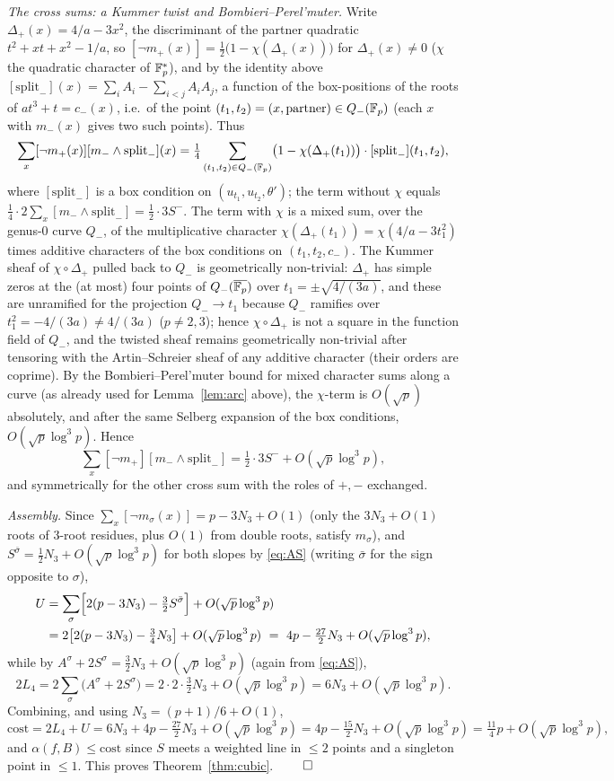 \smallskip\noindent\emph{The cross sums: a Kummer twist and Bombieri--Perel'muter.} Write
$\Delta_+(x)=4/a-3x^2$, the discriminant of the partner quadratic $t^2+xt+x^2-1/a$, so $[\neg m_+(x)]=
\tfrac12\bigl(1-\chi(\Delta_+(x))\bigr)$ for $\Delta_+(x)\ne0$ ($\chi$ the quadratic character of $\mathbb{F}_p^*$), and by
the identity above $[\mathrm{split}_-](x)=\sum_iA_i-\sum_{i<j}A_iA_j$, a function of the box-positions of the roots
of $at^3+t=c_-(x)$, i.e.\ of the point $(t_1,t_2)=(x,\text{partner})\in Q_-(\mathbb{F}_p)$ (each $x$ with $m_-(x)$ gives two such
points). Thus
\[
\sum_x[\neg m_+(x)][m_-\wedge\mathrm{split}_-](x)=\tfrac14\sum_{(t_1,t_2)\in Q_-(\mathbb{F}_p)}\bigl(1-\chi(\Delta_+(t_1))\bigr)\cdot[\mathrm{split}_-](t_1,t_2),
\]
where $[\mathrm{split}_-]$ is a box condition on $(u_{t_1},u_{t_2},\theta')$; the term without $\chi$ equals
$\tfrac14\cdot2\sum_x[m_-\wedge\mathrm{split}_-]=\tfrac12\cdot3S^-$. The term with $\chi$ is a mixed sum, over the genus-$0$ curve $Q_-$, of the
multiplicative character $\chi(\Delta_+(t_1))=\chi(4/a-3t_1^2)$ times additive characters of the box conditions on
$(t_1,t_2,c_-)$. The Kummer sheaf of $\chi\circ\Delta_+$ pulled back to $Q_-$ is geometrically non-trivial: $\Delta_+$
has simple zeros at the (at most) four points of $Q_-(\overline{\mathbb{F}_p})$ over $t_1=\pm\sqrt{4/(3a)}$, and these are
unramified for the projection $Q_-\to t_1$ because $Q_-$ ramifies over $t_1^2=-4/(3a)\ne4/(3a)$ ($p\ne2,3$); hence
$\chi\circ\Delta_+$ is not a square in the function field of $Q_-$, and the twisted sheaf remains geometrically
non-trivial after tensoring with the Artin--Schreier sheaf of any additive character (their orders are coprime).
By the Bombieri--Perel'muter bound for mixed character sums along a curve \cite{Perelmuter} (as already used for
Lemma~\ref{lem:arc} above), the $\chi$-term is $O(\sqrt p)$ absolutely, and after the same Selberg expansion of the
box conditions, $O(\sqrt p\log^3p)$. Hence
\[
\sum_x[\neg m_+][m_-\wedge\mathrm{split}_-]=\tfrac12\cdot3S^-+O(\sqrt p\log^3p),
\]
and symmetrically for the other cross sum with the roles of $+,-$ exchanged.

\smallskip\noindent\emph{Assembly.} Since $\sum_x[\neg m_\sigma(x)]=p-3N_3+O(1)$ (only the $3N_3+O(1)$ roots of
$3$-root residues, plus $O(1)$ from double roots, satisfy $m_\sigma$), and $S^{\bar\sigma}=\tfrac12N_3+O(\sqrt p\log^3p)$
for both slopes by \eqref{eq:AS} (writing $\bar\sigma$ for the sign opposite to $\sigma$),
\begin{align*}
U&=\sum_\sigma\Bigl[2(p-3N_3)-\tfrac32S^{\bar\sigma}\Bigr]+O(\sqrt p\log^3p)\\
&=2\bigl[2(p-3N_3)-\tfrac34N_3\bigr]+O(\sqrt p\log^3p)\ =\ 4p-\tfrac{27}2N_3+O(\sqrt p\log^3p),
\end{align*}
while by $A^\sigma+2S^\sigma=\tfrac32N_3+O(\sqrt p\log^3p)$ (again from \eqref{eq:AS}),
\[
2L_4=2\sum_\sigma\bigl(A^\sigma+2S^\sigma\bigr)=2\cdot2\cdot\tfrac32N_3+O(\sqrt p\log^3p)=6N_3+O(\sqrt p\log^3p).
\]
Combining, and using $N_3=(p+1)/6+O(1)$,
\[
\mathrm{cost}=2L_4+U=6N_3+4p-\tfrac{27}2N_3+O(\sqrt p\log^3p)=4p-\tfrac{15}2N_3+O(\sqrt p\log^3p)=\tfrac{11}4p+O(\sqrt p\log^3p),
\]
and $\alpha(f,B)\le\mathrm{cost}$ since $S$ meets a weighted line in $\le2$ points and a singleton point in $\le1$.
This proves Theorem~\ref{thm:cubic}. $\qed$

